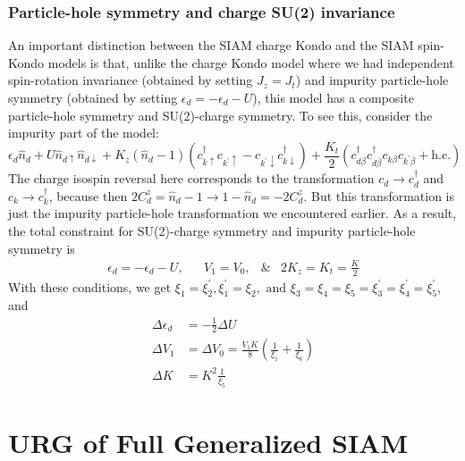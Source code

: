 \documentclass[twoside]{report}
\numberwithin{equation}{section}
\begin{document}
\subsection{Particle-hole symmetry and charge SU(2) invariance}
An important distinction between the SIAM charge Kondo and the SIAM spin-Kondo models is that, unlike the charge Kondo model where we had independent spin-rotation invariance (obtained by setting \(J_z = J_t\)) and impurity particle-hole symmetry (obtained by setting \(\epsilon_d = -\epsilon_d - U\)), this model has a composite particle-hole symmetry and SU(2)-charge symmetry. To see this, consider the impurity part of the model:
\begin{equation}
	\epsilon_d \hat n_d + U \hat n_{d\uparrow}\hat n_{d\downarrow} + K_z \left(\hat n_d - 1\right)\left(c^\dagger_{k\uparrow}c_{k^\prime\uparrow} - c_{k^\prime\downarrow}c^\dagger_{k\downarrow}\right) + \frac{K_t}{2}\left(c^\dagger_{d\beta}c^\dagger_{d\overline\beta}c_{k\beta}c_{k^\prime\overline\beta} + \text{h.c.}\right)
\end{equation}
The charge isospin reversal here corresponds to the transformation \(c_d \to c^\dagger_d\) and \(c_k \to c^\dagger_k\), because then \(2C^z_d = \hat n_d - 1 \to 1 - \hat n_d = -2C^z_d\). But this transformation is just the impurity particle-hole transformation we encountered earlier. As a result, the total constraint for SU(2)-charge symmetry and impurity particle-hole symmetry is
\begin{equation}\begin{aligned}
	\label{symm-charge}
	\epsilon_d = -\epsilon_d - U, && V_1 = V_0, &\& & 2K_z = K_t = \frac{K}{2} 
\end{aligned}\end{equation}
With these conditions, we get \(\xi_1 = \xi_2^\prime, \xi_1^\prime = \xi_2, \text{ and }\xi_3 = \xi_4 = \xi_5 = \xi_3^\prime = \xi_4^\prime = \xi_5^\prime\), and
\begin{equation}\begin{aligned}
	\Delta \epsilon_d &= -\frac{1}{2}\Delta U\\
	\Delta V_1 &= \Delta V_0 = \frac{V_1 K}{8}\left( \frac{1}{\xi_1} + \frac{1}{\xi_6} \right)\\
	\Delta K &= K^2 \frac{1}{\xi_5}
\end{aligned}\end{equation}

\chapter{URG of Full Generalized SIAM}
\label{fullurg}
\end{document}
